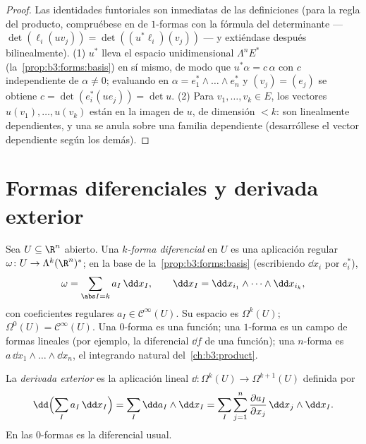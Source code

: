 \begin{proof}
Las identidades funtoriales son inmediatas de las definiciones (para la
regla del producto, compruébese en  de $1$-formas
con la fórmula del determinante --- $\det(\ell_i(uv_j)) =
\det((u^*\ell_i)(v_j))$ --- y extiéndase después bilinealmente). (1)
$u^*$ lleva el espacio unidimensional $\Lambda^nE^*$
(la~\cref{prop:b3:forms:basis}) en sí mismo, de modo que $u^*\alpha =
c\,\alpha$ con $c$ independiente de $\alpha \neq 0$; evaluando en
$\alpha = e_1^* \wedge \dots \wedge e_n^*$ y $(v_j) =
(e_j)$ se obtiene $c = \det(e_i^*(ue_j)) = \det u$. (2) Para
$v_1, \dots, v_k \in E$, los vectores $u(v_1), \dots,
u(v_k)$ están en la imagen de $u$, de dimensión $< k$: son linealmente
dependientes, y una 
se anula sobre una familia dependiente (desarróllese el vector
dependiente según los demás).
\end{proof}

\section{Formas diferenciales y derivada exterior}

\begin{definition}\label{def:b3:forms:diffform}
Sea $U \subseteq \R^n$ abierto. Una \emph{$k$-forma
diferencial} en $U$ es una aplicación regular
$\omega\colon U \to \Lambda^k(\R^n)^*$; en la base de
la~\cref{prop:b3:forms:basis} (escribiendo $\dd x_i$ por
$e_i^*$),
\[
\omega = \sum_{\abs I = k} a_I\,\dd x_I,
\qquad
\dd x_I = \dd x_{i_1} \wedge \dots \wedge \dd x_{i_k},
\]
con coeficientes regulares $a_I \in \mathcal C^\infty(U)$. Su espacio es
$\Omega^k(U)$; $\Omega^0(U) = \mathcal
C^\infty(U)$. Una $0$-forma es una función; una $1$-forma es un campo de
formas lineales (por ejemplo, la diferencial $\dd f$ de una función);
una $n$-forma es $a\,\dd x_1\wedge\dots\wedge\dd
x_n$, el integrando natural del~\cref{ch:b3:product}.
\end{definition}

\begin{definition}\label{def:b3:forms:d}
La \emph{derivada exterior} es la aplicación
lineal $\dd\colon \Omega^k(U) \to \Omega^{k+1}(U)$ definida por
\[
\dd\Bigl(\sum_I a_I\,\dd x_I\Bigr)
= \sum_I \dd a_I \wedge \dd x_I
= \sum_I\sum_{j=1}^n \frac{\partial a_I}{\partial
x_j}\,\dd x_j \wedge \dd x_I .
\]
En las $0$-formas es la diferencial usual.
\end{definition}

